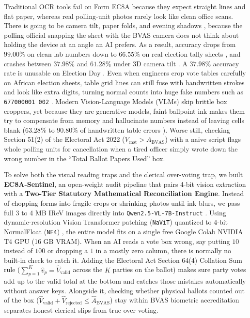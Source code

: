 \documentclass{article}
\begin{document}
Traditional OCR tools \cite{lecun1998gradient,li2023trocr,ouyang2025omnidocbench} fail on Form EC8A because they expect straight lines and flat paper, whereas real polling-unit photos rarely look like clean office scans. There is going to be camera tilt, paper folds, and evening shadows \cite{veza2024inec,icie2026shadow}, because the polling official snapping the sheet with the BVAS camera does not think about holding the device at an angle an AI prefers. As a result, accuracy drops from $99.00\%$ on clean lab numbers down to $66.55\%$ on real election tally sheets \cite{gondere2016election}, and crashes between $37.98\%$ and $61.28\%$ under 3D camera tilt \cite{zhou2026real5omnidocbench}. A $37.98\%$ accuracy rate is unusable on Election Day \cite{zhou2026real5omnidocbench}. Even when engineers crop vote tables carefully on African election sheets, table grid lines can still fuse with handwritten strokes and look like extra digits, turning normal counts into huge fake numbers such as \texttt{677000001 002} \cite{kimani2022using}. Modern Vision-Language Models (VLMs) \cite{bai2025qwen25vl,fu2025ocrbenchv2,alkhaled2025benchmarking,poznanski2025olmocr} skip brittle box croppers, yet because they are generative models, faint ballpoint ink makes them try to compensate from memory and hallucinate numbers instead of leaving cells blank ($63.28\%$ to $90.80\%$ of handwritten table errors \cite{zhang2026wildhandbench,koncile2025ocr}). Worse still, checking Section 51(2) of the Electoral Act 2022 ($V_{\text{cast}} > A_{\text{BVAS}}$) \cite{inec2022electoral} with a naive script flags whole polling units for cancellation when a tired officer simply wrote down the wrong number in the ``Total Ballot Papers Used'' box.

To solve both the visual reading traps and the clerical over-voting trap, we built \textbf{EC8A-Sentinel}, an open-weight audit pipeline that pairs 4-bit vision extraction with a \textbf{Two-Tier Statutory Mathematical Reconciliation Engine}. Instead of chopping forms into fragile crops or shrinking photos until ink blurs, we pass full 3 to 4 MB IReV images directly into \texttt{Qwen2.5-VL-7B-Instruct} \cite{bai2025qwen25vl}. Using dynamic-resolution Vision Transformer patching (\texttt{NaViT}) \cite{dehghani2023navit} quantized to 4-bit NormalFloat (\texttt{NF4}) \cite{dettmers2023qlora}, the entire model fits on a single free Google Colab NVIDIA T4 GPU (16 GB VRAM). When an AI reads a vote box wrong, say putting $10$ instead of $100$ or dropping a $1$ in a mostly zero column, there is normally no built-in check to catch it. Adding the Electoral Act Section 64(4) Collation Sum rule ($\sum_{p=1}^{K} \hat{v}_p = \hat{V}_{\text{valid}}$ across the $K$ parties on the ballot) \cite{inec2022electoral} makes sure party votes add up to the valid total at the bottom and catches those mistakes automatically without answer keys. Alongside it, checking whether physical ballots counted out of the box ($\hat{V}_{\text{valid}} + \hat{V}_{\text{rejected}} \le \hat{A}_{\text{BVAS}}$) stay within BVAS biometric accreditation separates honest clerical slips from true over-voting.
\end{document}
